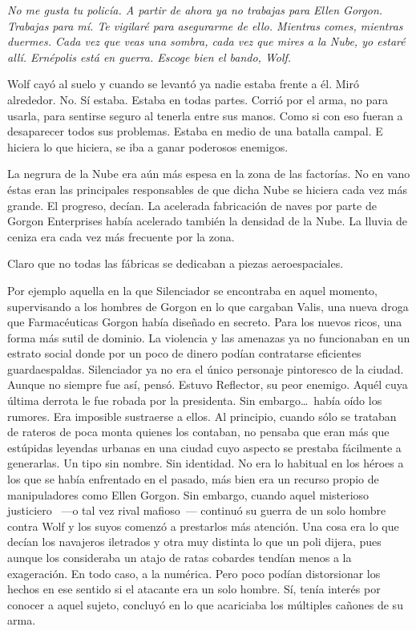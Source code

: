 \emph{No me gusta tu policía. A partir de ahora ya no trabajas para Ellen Gorgon. Trabajas para mí. Te vigilaré para asegurarme de ello. Mientras comes, mientras duermes. Cada vez que veas una sombra, cada vez que mires a la Nube, yo estaré allí. Ernépolis está en guerra. Escoge bien el bando, Wolf.}

Wolf cayó al suelo y cuando se levantó ya nadie estaba frente a él. Miró alrededor. No. Sí estaba. Estaba en todas partes. Corrió por el arma, no para usarla, para sentirse seguro al tenerla entre sus manos. Como si con eso fueran a desaparecer todos sus problemas. Estaba en medio de una batalla campal. E hiciera lo que hiciera, se iba a ganar poderosos enemigos.

\bigskip\noindent
La negrura de la Nube era aún más espesa en la zona de las factorías. No en vano éstas eran las principales responsables de que dicha Nube se hiciera cada vez más grande. El progreso, decían. La acelerada fabricación de naves por parte de Gorgon Enterprises había acelerado también la densidad de la Nube. La lluvia de ceniza era cada vez más frecuente por la zona.

Claro que no todas las fábricas se dedicaban a piezas aeroespaciales.

Por ejemplo aquella en la que Silenciador se encontraba en aquel momento, supervisando a los hombres de Gorgon en lo que cargaban Valis, una nueva droga que Farmacéuticas Gorgon había diseñado en secreto. Para los nuevos ricos, una forma más sutil de dominio. La violencia y las amenazas ya no funcionaban en un estrato social donde por un poco de dinero podían contratarse eficientes guardaespaldas. Silenciador ya no era el único personaje pintoresco de la ciudad. Aunque no siempre fue así, pensó. Estuvo Reflector, su peor enemigo. Aquél cuya última derrota le fue robada por la presidenta. Sin embargo\dots\ había oído los rumores. Era imposible sustraerse a ellos. Al principio, cuando sólo se trataban de rateros de poca monta quienes los contaban, no pensaba que eran más que estúpidas leyendas urbanas en una ciudad cuyo aspecto se prestaba fácilmente a generarlas. Un tipo sin nombre. Sin identidad. No era lo habitual en los héroes a los que se había enfrentado en el pasado, más bien era un recurso propio de manipuladores como Ellen Gorgon. Sin embargo, cuando aquel misterioso justiciero ~---o tal vez rival mafioso~--- continuó su guerra de un solo hombre contra Wolf y los suyos comenzó a prestarlos más atención. Una cosa era lo que decían los navajeros iletrados y otra muy distinta lo que un poli dijera, pues aunque los consideraba un atajo de ratas cobardes tendían menos a la exageración. En todo caso, a la numérica. Pero poco podían distorsionar los hechos en ese sentido si el atacante era un solo hombre. Sí, tenía interés por conocer a aquel sujeto, concluyó en lo que acariciaba los múltiples cañones de su arma.

